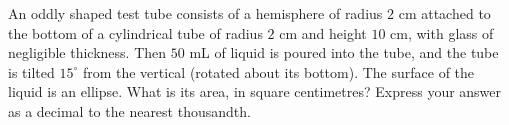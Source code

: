 An oddly shaped test tube consists of a hemisphere of radius $2$ cm attached to the bottom of a cylindrical tube of radius $2$ cm and height $10$ cm, with glass of negligible thickness. Then $50$ mL of liquid is poured into the tube, and the tube is tilted $15^\circ$ from the vertical (rotated about its bottom). The surface of the liquid is an ellipse. What is its area, in square centimetres? Express your answer as a decimal to the nearest thousandth.
